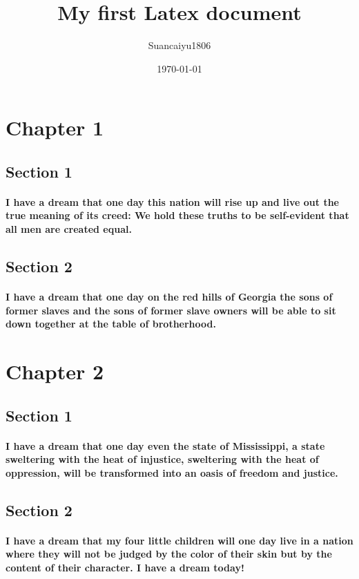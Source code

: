\documentclass{article}
\title{My first Latex document}
\author{Suancaiyu1806}
\date{\today}
\begin{document}
\maketitle

\thispagestyle{empty}

\newpage

\tableofcontents

\newpage
\section{Chapter 1}

\subsection{Section 1}
\paragraph{I have a dream that one day this nation will rise up and live out the true meaning of its creed: We hold these truths to be self-evident that all men are created equal.}

\subsection{Section 2}
\paragraph{I have a dream that one day on the red hills of Georgia the sons of former slaves and the sons of former slave owners will be able to sit down together at the table of brotherhood.}

\section{Chapter 2}

\subsection{Section 1}
\paragraph{I have a dream that one day even the state of Mississippi, a state sweltering with the heat of injustice, sweltering with the heat of oppression, will be transformed into an oasis of freedom and justice.}

\subsection{Section 2}
\paragraph{I have a dream that my four little children will one day live in a nation where they will not be judged by the color of their skin but by the content of their character. I have a dream today!}
\end{document}
